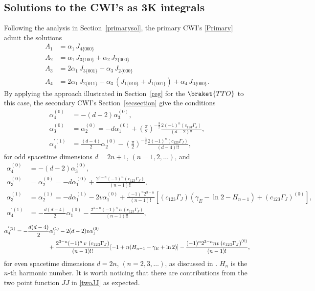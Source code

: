 \documentclass[a4paper,11pt,openright,twoside]{book}
\newcommand{\secref}[1]{Section~\ref{#1}}		%
\numberwithin{equation}{section}
\begin{document}
{{{\subsection{Solutions to the CWI's as 3K integrals}
Following the analysis in \secref{primarysol}, the primary CWI's \eqref{Primary} admit the solutions
\begin{equation}
	\label{SolTJJ}
	\begin{split}
		A_1&=\alpha_1\, J_{4\{000\}}\\
		A_2&=\alpha_1\, J_{3\{100\}}+\alpha_2\,J_{2\{000\}}\\
		A_3&=2\alpha_1\, J_{3\{001\}}+\alpha_3\,J_{2\{000\}}\\
		A_4&=2\alpha_1\,J_{2\{011\}}+\alpha_3\,\left(J_{1\{010\}}+ J_{1\{001\}}\right)+\alpha_4\, J_{0\{000\}}.
	\end{split}
\end{equation}
By applying the approach illustrated in \secref{reg} for the $\braket{TTO}$ to this case, the secondary CWI's \secref{secsection} give the conditions
\begin{align}
	\alpha_4^{(0)}&=-(d-2)\alpha_3^{(0)},\\
	\alpha_3^{(0)}&=\alpha_2^{(0)}=-d\alpha_1^{(0)}+\left(\frac{\pi}{2}\right)^{-\frac{3}{2}}\frac{2(-1)^n\left(c_{123} \Gamma_J \right)}{(d-2)!!},\\
	\alpha_4^{'(1)}&=\frac{(d-4)}{2}\alpha_2^{(0)}-\left(\frac{\pi}{2}\right)^{-\frac{3}{2}}\frac{2(-1)^n\left(c_{123} \Gamma_J \right)}{(d-4)!!},
\end{align}
for odd spacetime dimensions $d=2n+1$, $(n=1,2,\dots)$, and 
\begin{align}
	\alpha_4^{(0)}&=-(d-2)\alpha_3^{(0)},\\
	\alpha_3^{(0)}&=\alpha_2^{(0)}=-d\alpha_1^{(0)}+\frac{2^{3-n}(-1)^n\left(c_{123} \Gamma_J \right)}{(n-1)!!},\\
	\alpha_3^{(1)}&=\alpha_2^{(1)}=-d\alpha_1^{(1)}-2v\alpha_1^{(0)}+\frac{(-1)^n2^{3-n}}{(n-1)!}[\left(c_{123} \Gamma_J \right)(\gamma_E-\ln 2-H_{n-1})+\left(c_{123} \Gamma_J \right)^{(0)}],\\
	\alpha_4^{'(1)}&=-\frac{d(d-4)}{2}\alpha_1^{(0)}-\frac{2^{3-n}(-1)^n\,n\,\left(c_{123} \Gamma_J \right)}{(n-1)!!},
\end{align}
\begin{align}
	\alpha_4^{'(2)}&=-\frac{d(d-4)}{2}\alpha_1^{(1)}-2(d-2)v\alpha_1^{(0)}\notag\\
	&\hspace{2cm}+\frac{2^{3-n}(-1)^n\,v\,\left(c_{123} \Gamma_J \right)}{(n-1)!!}[-1+n(H_{n-1}-\gamma_E+\ln 2)]-\frac{(-1)^n2^{3-n}nv\left(c_{123} \Gamma_J \right)^{(0)}}{(n-1)!},
\end{align}
for even spacetime dimensions $d=2n$, $(n=2,3,\dots)$, as discussed in \cite{ Bzowski:2018fql,Bzowski:2017poo}. $H_n$ is the $n$-th harmonic number.
It is worth noticing that there are contributions from the two point function $JJ$ in \eqref{twoJJ} as expected. 
}}}
\end{document}
